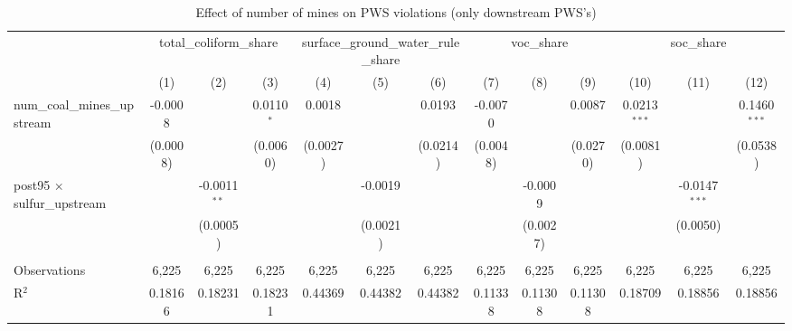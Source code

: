 
\begin{table}[htbp]
   \caption{\label{olsrf2sls_nummine_non_mine_vio_1985to2005dwnstrm} Effect of number of mines on PWS violations (only downstream PWS's)}
   \bigskip
   \centering
   \begin{adjustbox}{width = \textwidth, center}
      \begin{tabular}{lcccccccccccc}
         \toprule
          & \multicolumn{3}{c}{total\_coliform\_share} & \multicolumn{3}{c}{surface\_ground\_water\_rule\_share} & \multicolumn{3}{c}{voc\_share} & \multicolumn{3}{c}{soc\_share}\\
                                                           & (1)           & (2)            & (3)           & (4)           & (5)           & (6)           & (7)           & (8)                   & (9)                   & (10)           & (11)            & (12)\\  
         \midrule 
         num\_coal\_mines\_upstream                        & -0.0008       &                & 0.0110$^{*}$  & 0.0018        &               & 0.0193        & -0.0070       &                       & 0.0087                & 0.0213$^{***}$ &                 & 0.1460$^{***}$\\   
                                                           & (0.0008)      &                & (0.0060)      & (0.0027)      &               & (0.0214)      & (0.0048)      &                       & (0.0270)              & (0.0081)       &                 & (0.0538)\\   
         post95 $\times$ sulfur\_upstream                  &               & -0.0011$^{**}$ &               &               & -0.0019       &               &               & -0.0009               &                       &                & -0.0147$^{***}$ &   \\   
                                                           &               & (0.0005)       &               &               & (0.0021)      &               &               & (0.0027)              &                       &                & (0.0050)        &   \\   
          \\
         Observations                                      & 6,225         & 6,225          & 6,225         & 6,225         & 6,225         & 6,225         & 6,225         & 6,225                 & 6,225                 & 6,225          & 6,225           & 6,225\\  
         R$^2$                                             & 0.18166       & 0.18231        & 0.18231       & 0.44369       & 0.44382       & 0.44382       & 0.11338       & 0.11308               & 0.11308               & 0.18709        & 0.18856         & 0.18856\\  

\end{tabular}
\end{adjustbox}
\end{table}
